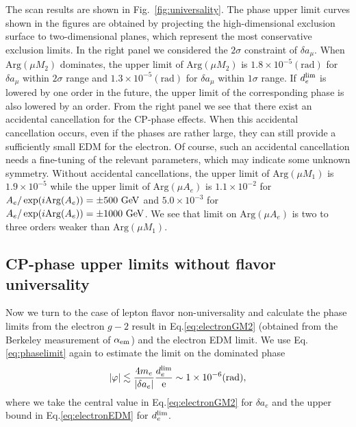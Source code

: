 \documentclass[a4paper,11pt]{article}
\begin{document}
   The scan results are shown in Fig.~\ref{fig:universality}. The phase upper limit curves shown in the figures are obtained by projecting the high-dimensional exclusion surface to two-dimensional planes, which represent the most conservative exclusion limits. In the right panel we considered the $2\sigma$ constraint of $\delta a_\mu$. When $\text{Arg}(\mu M_2)$ dominates, the upper limit of $\text{Arg}(\mu M_2)$ is $1.8\times 10^{-5}(\text{rad})$ for $\delta a_\mu$ within $2\sigma$ range and $1.3\times 10^ {-5}(\text{rad})$ for $\delta a_\mu$ within $1\sigma$ range. If $d^{\rm lim}_e$ is lowered by one order in the future, the upper limit of the corresponding phase is also lowered by an order. From the right panel we see that there exist an accidental cancellation for the CP-phase effects. When this accidental cancellation occurs, even if the phases are rather large, they can still provide a sufficiently small EDM for the electron. Of course, 
   such an accidental cancellation needs a fine-tuning of the relevant parameters, which may indicate some unknown symmetry.  
  Without accidental cancellations, the upper limit of $\text{Arg}(\mu M_1)$ is $1.9\times 10^{-5}$ while 
  the upper limit of $\text{Arg}(\mu A_e)$ is $1.1\times 10^{-2}$ for $A_e/\exp(i{\rm Arg}(A_e))=\pm 500~{ \rm GeV}$ and $5.0\times 10^{-3}$ for $A_e/\exp(i{\rm Arg}(A_e))=\pm 1000~{\rm GeV}$. We see that limit on $\text{Arg}(\mu A_e)$ is two to three orders weaker than $\text{Arg}(\mu M_1)$. 

   \subsection{CP-phase upper limits without flavor universality}
   Now we turn to the case of lepton flavor non-universality and calculate the phase limits from the electron $g-2$ result in Eq.\eqref{eq:electronGM2} (obtained from the Berkeley measurement of $\alpha_{\rm em}$) and the electron EDM limit. We use Eq.\eqref{eq:phaselimit} again to estimate the limit on the dominated phase
   \begin{equation}\label{eq:piliephaselimit}
       |\varphi|\lesssim\frac{4m_e}{|\delta a_e|} \frac{d_e^{\rm lim}}{\rm e}\sim 1\times10^{-6}(\text{rad}),
   \end{equation}
    where we take the central value in Eq.\eqref{eq:electronGM2} for $\delta a_e$ and  the upper bound in Eq.\eqref{eq:electronEDM} for $d_e^{\rm lim}$. 
    
\end{document}
